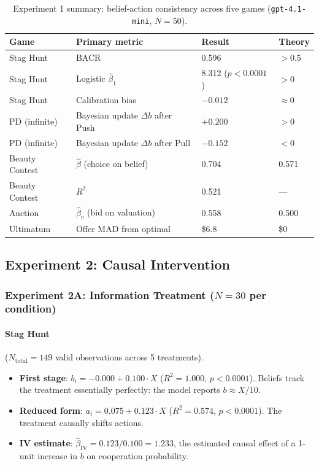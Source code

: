 \documentclass[12pt]{article}
\begin{document}
\begin{table}[h]
\centering
\caption{Experiment 1 summary: belief-action consistency across five games (\texttt{gpt-4.1-mini}, $N=50$).}
\label{tab:exp1_results}
\begin{tabular}{@{}llll@{}}
\toprule
Game & Primary metric & Result & Theory \\
\midrule
Stag Hunt & BACR & 0.596 & $>0.5$ \\
Stag Hunt & Logistic $\hat\beta_1$ & 8.312 ($p<0.0001$) & $>0$ \\
Stag Hunt & Calibration bias & $-0.012$ & $\approx 0$ \\
PD (infinite) & Bayesian update $\Delta b$ after Push & $+0.200$ & $>0$ \\
PD (infinite) & Bayesian update $\Delta b$ after Pull & $-0.152$ & $<0$ \\
Beauty Contest & $\hat\beta$ (choice on belief) & 0.704 & 0.571 \\
Beauty Contest & $R^2$ & 0.521 & --- \\
Auction & $\hat\beta_v$ (bid on valuation) & 0.558 & 0.500 \\
Ultimatum & Offer MAD from optimal & \$6.8 & \$0 \\
\bottomrule
\end{tabular}
\end{table}


\subsection{Experiment 2: Causal Intervention}

\subsubsection{Experiment 2A: Information Treatment ($N=30$ per condition)}

\paragraph{Stag Hunt} ($N_{\text{total}}=149$ valid observations across 5 treatments).

\begin{itemize}[nosep]
    \item \textbf{First stage}: $b_i = -0.000 + 0.100 \cdot X$ ($R^2 = 1.000$, $p < 0.0001$). Beliefs track the treatment essentially perfectly: the model reports $b \approx X/10$.
    \item \textbf{Reduced form}: $a_i = 0.075 + 0.123 \cdot X$ ($R^2 = 0.574$, $p < 0.0001$). The treatment causally shifts actions.
    \item \textbf{IV estimate}: $\hat\beta_{\text{IV}} = 0.123 / 0.100 = 1.233$, the estimated causal effect of a 1-unit increase in $b$ on cooperation probability.
\end{itemize}
\end{document}
